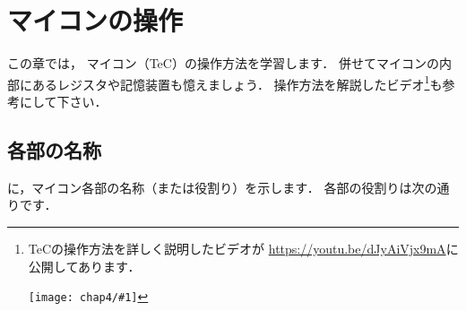 \renewcommand{\myincludegraphics}[2]{\texttt{[image: chap4/\#1]}}

\chapter{マイコンの操作\label{sousa}}

この章では，
マイコン（TeC）の操作方法を学習します．
併せてマイコンの内部にあるレジスタや記憶装置も憶えましょう．
操作方法を解説したビデオ\footnote{
\begin{minipage}[t]{0.9\columnwidth}
\begin{minipage}{0.75\columnwidth}
TeCの操作方法を詳しく説明したビデオが
\url{https://youtu.be/dJyAiVjx9mA}に公開してあります．
\end{minipage}\hfill
\begin{minipage}{0.2\columnwidth}
\myincludegraphics{QR2.png}{scale=0.3}
\end{minipage}
\end{minipage}
}も参考にして下さい．

\section{各部の名称}
に，マイコン各部の名称（または役割り）を示します．
各部の役割りは次の通りです．


